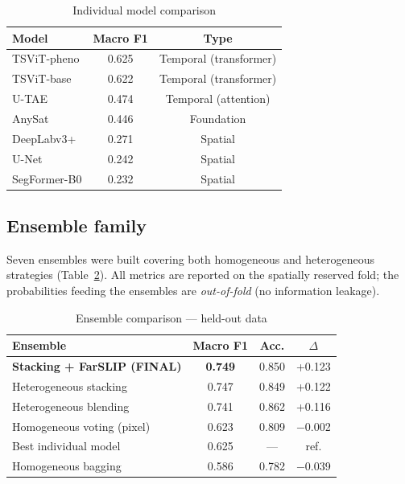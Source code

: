\documentclass{article}
\begin{document}
\begin{table}[htbp]
\caption{Individual model comparison}
\label{tab:individual_models}
\centering
\begin{tabular}{lcc}
\toprule
\textbf{Model} & \textbf{Macro F1} & \textbf{Type} \\
\midrule
TSViT-pheno     & 0.625 & Temporal (transformer) \\
TSViT-base      & 0.622 & Temporal (transformer) \\
U-TAE           & 0.474 & Temporal (attention) \\
AnySat          & 0.446 & Foundation \\
DeepLabv3+      & 0.271 & Spatial \\
U-Net           & 0.242 & Spatial \\
SegFormer-B0    & 0.232 & Spatial \\
\bottomrule
\end{tabular}
\end{table}

\subsection{Ensemble family}

Seven ensembles were built covering both homogeneous and heterogeneous
strategies (Table~\ref{tab:ensembles}). All metrics are reported on the
spatially reserved fold; the probabilities feeding the ensembles are
\textit{out-of-fold} (no information leakage).

\begin{table}[htbp]
\caption{Ensemble comparison --- held-out data}
\label{tab:ensembles}
\centering
\begin{tabular}{lccc}
\toprule
\textbf{Ensemble} & \textbf{Macro F1} & \textbf{Acc.} & \textbf{$\Delta$} \\
\midrule
\textbf{Stacking + FarSLIP (FINAL)} & \textbf{0.749} & 0.850 & +0.123 \\
Heterogeneous stacking      & 0.747 & 0.849 & +0.122 \\
Heterogeneous blending      & 0.741 & 0.862 & +0.116 \\
Homogeneous voting (pixel)  & 0.623 & 0.809 & $-$0.002 \\
Best individual model       & 0.625 & ---   & ref. \\
Homogeneous bagging         & 0.586 & 0.782 & $-$0.039 \\
\bottomrule
\end{tabular}
\end{table}
\end{document}

